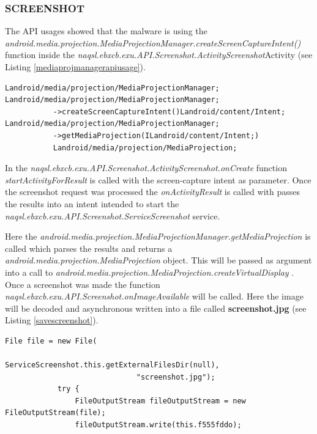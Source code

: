 \documentclass[10pt,titlepage]{article}
\begin{document}
\newpage
\subsubsection{SCREENSHOT} \label{screenshot}
The API usages showed that the malware is using the \textit{android.media.projection.MediaProjectionManager.createScreenCaptureIntent()} function inside the \textit{naqsl.ebxcb.exu.API.Screenshot.ActivityScreenshot}Activity (see Listing \ref{mediaprojmanagerapiusage}). 

\begin{lstlisting}[label=mediaprojmanagerapiusage,caption=List of calls to \textit{android.media.projection.MediaProjectionManager.createScreenCaptureIntent} tells that the malware tries to do screenshots.,frame=tb]
Landroid/media/projection/MediaProjectionManager;
Landroid/media/projection/MediaProjectionManager;
           ->createScreenCaptureIntent()Landroid/content/Intent;
Landroid/media/projection/MediaProjectionManager;
           ->getMediaProjection(ILandroid/content/Intent;)
           Landroid/media/projection/MediaProjection;
\end{lstlisting}

In the \textit{naqsl.ebxcb.exu.API.Screenshot.ActivityScreenshot.onCreate}
function \textit{startActivityForResult} is called with the screen-capture intent as parameter. Once the screenshot request was processed the \textit{onActivityResult} is called with passes the results into an intent intended to start the \textit{naqsl.ebxcb.exu.API.Screenshot.ServiceScreenshot} service.

Here the \textit{android.media.projection.MediaProjectionManager.getMediaProjection}
is called which parses the results and returns a \textit{android.media.projection.MediaProjection} object. This will be passed as argument into a call to \textit{android.media.projection.MediaProjection.createVirtualDisplay}
. Once a screenshot was made the function \textit{naqsl.ebxcb.exu.API.Screenshot.onImageAvailable} will be called. Here the image will be decoded and asynchronous written into a file called \textbf{screenshot.jpg} (see Listing \ref{savescreenshot}).
\begin{lstlisting}[label=savescreenshot,caption=The malware stores the screenshot into the external files dir with filename \textbf{screenshot.jpg}.,frame=tb]
            File file = new File(
                              ServiceScreenshot.this.getExternalFilesDir(null),
                              "screenshot.jpg");
            try {
                FileOutputStream fileOutputStream = new FileOutputStream(file);
                fileOutputStream.write(this.f555fddo);
\end{lstlisting}
\end{document}

